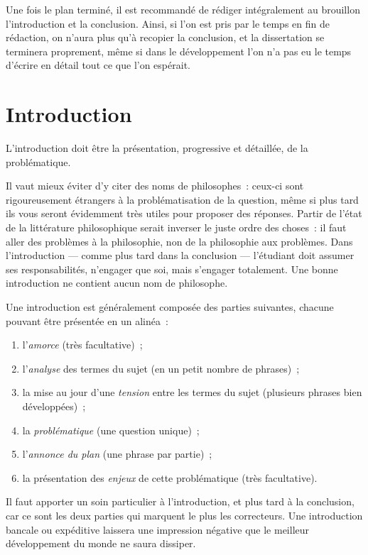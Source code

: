 \documentclass[a4paper]{article}
\begin{document}
Une fois le plan terminé, il est recommandé de rédiger intégralement au
brouillon l'introduction et la conclusion. Ainsi, si l'on est pris par
le temps en fin de rédaction, on n'aura plus qu'à recopier la
conclusion, et la dissertation se terminera proprement, même si dans le
développement l'on n'a pas eu le temps d'écrire en détail tout ce que
l'on espérait.

\section{Introduction}
\label{sec-2}

L'introduction doit être la présentation, progressive et détaillée, de
la problématique.

Il vaut mieux éviter d'y citer des noms de philosophes : ceux-ci sont
rigoureusement étrangers à la problématisation de la question, même si
plus tard ils vous seront évidemment très utiles pour proposer des
réponses. Partir de l'état de la littérature philosophique serait
inverser le juste ordre des choses : il faut aller des problèmes à la
philosophie, non de la philosophie aux problèmes. Dans l'introduction
--- comme plus tard dans la conclusion --- l'étudiant doit assumer ses
responsabilités, n'engager que soi, mais s'engager totalement. Une bonne
introduction ne contient aucun nom de philosophe.

Une introduction est généralement composée des parties suivantes,
chacune pouvant être présentée en un alinéa :

\begin{enumerate}
\item l'\emph{amorce} (très facultative) ;

\item l'\emph{analyse} des termes du sujet (en un petit nombre de phrases) ;

\item la mise au jour d'une \emph{tension} entre les termes du sujet (plusieurs
phrases bien développées) ;

\item la \emph{problématique} (une question unique) ;

\item l'\emph{annonce du plan} (une phrase par partie) ;

\item la présentation des \emph{enjeux} de cette problématique (très
facultative).
\end{enumerate}

Il faut apporter un soin particulier à l'introduction, et plus tard à la
conclusion, car ce sont les deux parties qui marquent le plus les
correcteurs. Une introduction bancale ou expéditive laissera une
impression négative que le meilleur développement du monde ne saura
dissiper.
\end{document}
